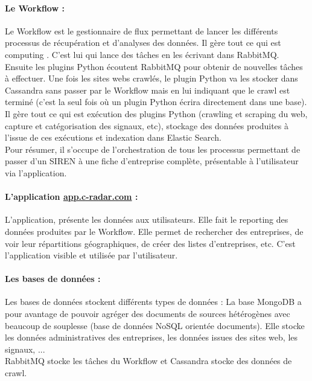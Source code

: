             \paragraph{Le Workflow :}
                Le Workflow est le gestionnaire de flux permettant de lancer les différents processus de récupération et d'analyses des données. Il gère tout ce qui est \og computing \fg. C'est lui qui lance des tâches en les écrivant dans RabbitMQ. Ensuite les plugins Python écoutent RabbitMQ pour obtenir de nouvelles tâches à effectuer. Une fois les sites webs crawlés, le plugin Python va les stocker dans Cassandra sans passer par le Workflow mais en lui indiquant que le crawl est terminé (c'est la seul fois où un plugin Python écrira directement dans une base). Il gère tout ce qui est exécution des plugins Python (crawling et scraping du web, capture et catégorisation des signaux, etc), stockage des données produites à l'issue de ces exécutions et indexation dans Elastic Search.\\
                Pour résumer, il s'occupe de l'orchestration de tous les processus permettant de passer d'un SIREN à une fiche d'entreprise complète, présentable à l'utilisateur via l'application.

            \paragraph{L'application \href{app.c-radar.com}{app.c-radar.com} :}
                L'application, \og présente \fg les données aux utilisateurs. Elle fait le reporting des données produites par le Workflow. Elle permet de rechercher des entreprises, de voir leur répartitions géographiques, de créer des listes d'entreprises, etc. C'est l'application visible et utilisée par l'utilisateur.

            \paragraph{Les bases de données :}
                Les bases de données stockent différents types de données :
                La base MongoDB a pour avantage de pouvoir agréger des documents de sources hétérogènes avec beaucoup de souplesse (base de données NoSQL orientée documents). Elle stocke les données administratives des entreprises, les données issues des sites web, les signaux, ...\\
                RabbitMQ stocke les tâches du Workflow et Cassandra stocke des données de crawl.

